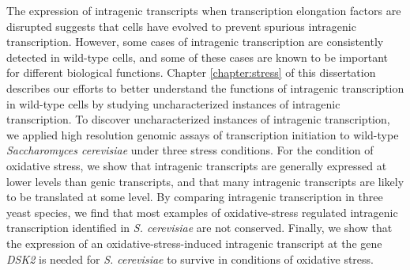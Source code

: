 \begin{abstractpage}
The expression of intragenic transcripts when transcription elongation factors are disrupted suggests that cells have evolved to prevent spurious intragenic transcription.
However, some cases of intragenic transcription are consistently detected in wild-type cells, and some of these cases are known to be important for different biological functions.
Chapter \ref{chapter:stress} of this dissertation describes our efforts to better understand the functions of intragenic transcription in wild-type cells by studying uncharacterized instances of intragenic transcription.
To discover uncharacterized instances of intragenic transcription, we applied high resolution genomic assays of transcription initiation to wild-type \textit{Saccharomyces cerevisiae} under three stress conditions.
For the condition of oxidative stress, we show that intragenic transcripts are generally expressed at lower levels than genic transcripts, and that many intragenic transcripts are likely to be translated at some level.
By comparing intragenic transcription in three yeast species, we find that most examples of oxidative-stress regulated intragenic transcription identified in \textit{S. cerevisiae} are not conserved.
Finally, we show that the expression of an oxidative-stress-induced intragenic transcript at the gene \textit{DSK2} is needed for \textit{S. cerevisiae} to survive in conditions of oxidative stress.

\end{abstractpage}
\cleardoublepage

\tableofcontents
\cleardoublepage


\listoffigures
{}
\cleardoublepage

